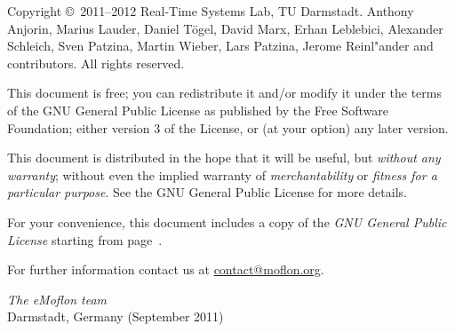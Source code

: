\documentclass[11pt,a4paper, twoside]{book}
\begin{document}
   
  
\frontmatter   

\maketitle

\begin{small} 
Copyright \copyright~2011--2012 Real-Time Systems Lab, TU Darmstadt.
Anthony Anjorin, Marius Lauder, Daniel T\"ogel, David Marx, Erhan Leblebici, Alexander Schleich, Sven Patzina, Martin Wieber, Lars Patzina, Jerome Reinl"ander and contributors.
All rights reserved.

This document is free; you can redistribute it and/or modify it under the terms of the GNU General Public License as published by the Free Software Foundation; either version 3 of the License, or (at your option) any later version.
 
This document is distributed in the hope that it will be useful, but \emph{without any warranty}; without even the implied warranty of \emph{merchantability} or \emph{fitness for a particular purpose}.
See the GNU General Public License for more details.
 
For your convenience, this document includes a copy of the \emph{GNU General Public License} starting from page~\pageref{chap:gpl}.
  
For further information contact us at \href{mailto:contact@moflon.org}{contact@moflon.org}.
  
\vskip3cm
\textit{The eMoflon team}\\
Darmstadt, Germany (September 2011)
\end{small}


\tableofcontents

\setcounter{romanpages}{\value{page}}

\mainmatter
 













 
\end{document}
